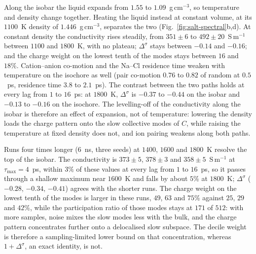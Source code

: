 Along the isobar the liquid expands from $1.55$ to $1.09$~g\,cm$^{-3}$, so temperature and density change together.
Heating the liquid instead at constant volume, at its $1100$~K density of $1.446$~g\,cm$^{-3}$, separates the two (Fig.~\ref{fig:salt-spectral}b,d).
At constant density the conductivity rises steadily, from $351 \pm 6$ to $492 \pm 20$~S\,m$^{-1}$ between $1100$ and $1800$~K, with no plateau; $\Delta^{\sigma}$ stays between $-0.14$ and $-0.16$; and the charge weight on the lowest tenth of the modes stays between $16$ and $18\%$.
Cation--anion co-motion and the Na--Cl residence time weaken with temperature on the isochore as well (pair co-motion $0.76$ to $0.82$ of random at $0.5$~ps, residence time $3.8$ to $2.1$~ps).
The contrast between the two paths holds at every lag from $1$ to $16$~ps: at $1800$~K, $\Delta^{\sigma}$ is $-0.37$ to $-0.44$ on the isobar and $-0.13$ to $-0.16$ on the isochore.
The levelling-off of the conductivity along the isobar is therefore an effect of expansion, not of temperature: lowering the density loads the charge pattern onto the slow collective modes of $C$, while raising the temperature at fixed density does not, and ion pairing weakens along both paths.

Runs four times longer ($6$~ns, three seeds) at $1400$, $1600$ and $1800$~K resolve the top of the isobar.
The conductivity is $373 \pm 5$, $378 \pm 3$ and $358 \pm 5$~S\,m$^{-1}$ at $\tau_{\max} = 4$~ps, within $3\%$ of these values at every lag from $1$ to $16$~ps, so it passes through a shallow maximum near $1600$~K and falls by about $5\%$ at $1800$~K; $\Delta^{\sigma}$ ($-0.28$, $-0.34$, $-0.41$) agrees with the shorter runs.
The charge weight on the lowest tenth of the modes is larger in these runs, $49$, $63$ and $75\%$ against $25$, $29$ and $42\%$, while the participation ratio of those modes stays at $171$ of $512$: with more samples, noise mixes the slow modes less with the bulk, and the charge pattern concentrates further onto a delocalised slow subspace.
The decile weight is therefore a sampling-limited lower bound on that concentration, whereas $1 + \Delta^{\sigma}$, an exact identity, is not.
